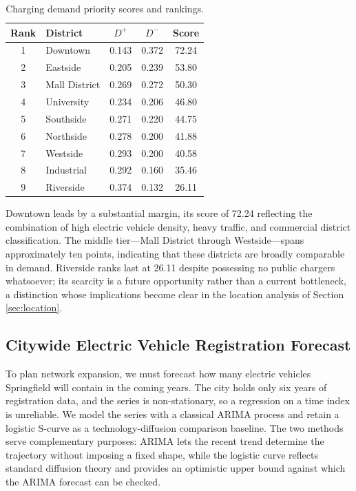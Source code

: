 \documentclass[11pt]{article}
\begin{document}
\begin{table}[H]
\centering
\caption{Charging demand priority scores and rankings.}
\label{tab:demand}
\begin{tabular}{clccc}
\toprule
Rank & District & $D^{+}$ & $D^{-}$ & Score \\
\midrule
1 & Downtown      & 0.143 & 0.372 & 72.24 \\
2 & Eastside      & 0.205 & 0.239 & 53.80 \\
3 & Mall District & 0.269 & 0.272 & 50.30 \\
4 & University    & 0.234 & 0.206 & 46.80 \\
5 & Southside     & 0.271 & 0.220 & 44.75 \\
6 & Northside     & 0.278 & 0.200 & 41.88 \\
7 & Westside      & 0.293 & 0.200 & 40.58 \\
8 & Industrial    & 0.292 & 0.160 & 35.46 \\
9 & Riverside     & 0.374 & 0.132 & 26.11 \\
\bottomrule
\end{tabular}
\end{table}

Downtown leads by a substantial margin, its score of 72.24 reflecting the combination of high electric vehicle density, heavy traffic, and commercial district classification. The middle tier---Mall District through Westside---spans approximately ten points, indicating that these districts are broadly comparable in demand. Riverside ranks last at 26.11 despite possessing no public chargers whatsoever; its scarcity is a future opportunity rather than a current bottleneck, a distinction whose implications become clear in the location analysis of Section \ref{sec:location}.

\subsection{Citywide Electric Vehicle Registration Forecast}
\label{subsec:forecast}

To plan network expansion, we must forecast how many electric vehicles Springfield will contain in the coming years. The city holds only six years of registration data, and the series is non-stationary, so a regression on a time index is unreliable. We model the series with a classical ARIMA process and retain a logistic S-curve as a technology-diffusion comparison baseline. The two methods serve complementary purposes: ARIMA lets the recent trend determine the trajectory without imposing a fixed shape, while the logistic curve reflects standard diffusion theory and provides an optimistic upper bound against which the ARIMA forecast can be checked.
\end{document}
